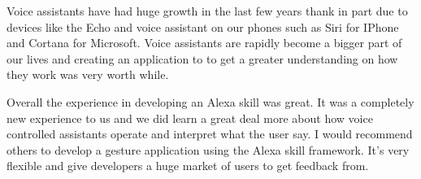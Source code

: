 Voice assistants have had huge growth in the last few years thank in part due to devices like the Echo and voice assistant on our phones such as Siri for IPhone and Cortana for Microsoft. Voice assistants are rapidly become a bigger part of our lives and creating an application to to get a greater understanding on how they work was very worth while.

Overall the experience in developing an Alexa skill was great. It was a completely new experience to us and we did learn a great deal more about how voice controlled assistants operate and interpret what the user say. I would recommend others to develop a gesture application using the Alexa skill framework. It's very flexible and give developers a huge market of users to get feedback from.
